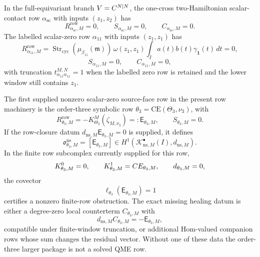 \begin{prop}
\label{prop:app-closed-rows-and-theta-three-source-face}
  In the full-equivariant branch \(V=C^{N|N}\), the one-cross
  two-Hamiltonian scalar-contact row
  \(\alpha_{\mathrm{sc}}\) with inputs \((z_1,z_2)\) has
  \[
    R^{\mathrm{row}}_{\alpha_{\mathrm{sc}},M}=0,
    \qquad
    S_{\alpha_{\mathrm{sc}},M}=0,
    \qquad
    C_{\alpha_{\mathrm{sc}},M}=0 .
  \]
  The labelled scalar-zero row \(\alpha_{11}\) with inputs
  \((z_1,z_1)\) has
  \[
    R^{\mathrm{row}}_{\alpha_{11},M}
      =
    \operatorname{Str}_{\mathrm{cyc}}
      (\mu_{\beta_{11}}(\mathfrak m))\,
    \omega(z_1,z_1)
    \int_Ia(t)b(t)\gamma_{\mathbf 1}(t)\,dt
      =0,
  \]
  \[
    S_{\alpha_{11},M}=0,\qquad C_{\alpha_{11},M}=0,
  \]
  with truncation \(t^{M,N}_{\alpha_{11}\alpha_{11}}=1\) when the labelled
  zero row is retained and the lower window still contains \(z_1\).

  The first supplied nonzero scalar-zero source-face row in the present
  row machinery is the order-three symbolic row
  \(\theta_3=\mathrm{CE}(\Theta_3,\nu_3)\), with
  \[
    R^{\mathrm{row}}_{\theta_3,M}
      =
    -K^M_{\Theta_3}(\zeta_{M,\nu_3})
      =:\mathsf E_{\theta_3,M},
    \qquad
    S_{\theta_3,M}=0 .
  \]
  If the row-closure datum
  \(d_{\mathrm{ns},M}\mathsf E_{\theta_3,M}=0\) is supplied, it defines
  \[
    \mathfrak o^{\mathrm{ns}}_{\theta_3,M}
      =
    [\mathsf E_{\theta_3,M}]
    \in
    H^1(\mathcal K^\bullet_{\mathrm{ns},M}(I),d_{\mathrm{ns},M}).
  \]
  In the finite row subcomplex currently supplied for this row,
  \[
    K^0_{\theta_3,M}=0,\qquad
    K^1_{\theta_3,M}=CE_{\theta_3,M},\qquad
    d_{\theta_3,M}=0,
  \]
  the covector
  \[
    \ell_{\theta_3}(\mathsf E_{\theta_3,M})=1
  \]
  certifies a nonzero finite-row obstruction.  The exact missing healing
  datum is either a degree-zero local counterterm
  \(C_{\theta_3,M}\) with
  \[
    d_{\mathrm{ns},M}C_{\theta_3,M}
      =-\mathsf E_{\theta_3,M},
  \]
  compatible under finite-window truncation, or additional Hom-valued
  companion rows whose sum changes the residual vector.  Without one of
  these data the order-three larger package is not a solved QME row.
\end{prop}

